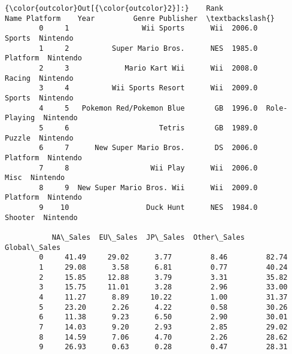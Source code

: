 \documentclass[11pt]{article}
\begin{document}
\begin{Verbatim}[commandchars=\\\{\}]
{\color{outcolor}Out[{\color{outcolor}2}]:}    Rank                       Name Platform    Year         Genre Publisher  \textbackslash{}
        0     1                 Wii Sports      Wii  2006.0        Sports  Nintendo   
        1     2          Super Mario Bros.      NES  1985.0      Platform  Nintendo   
        2     3             Mario Kart Wii      Wii  2008.0        Racing  Nintendo   
        3     4          Wii Sports Resort      Wii  2009.0        Sports  Nintendo   
        4     5   Pokemon Red/Pokemon Blue       GB  1996.0  Role-Playing  Nintendo   
        5     6                     Tetris       GB  1989.0        Puzzle  Nintendo   
        6     7      New Super Mario Bros.       DS  2006.0      Platform  Nintendo   
        7     8                   Wii Play      Wii  2006.0          Misc  Nintendo   
        8     9  New Super Mario Bros. Wii      Wii  2009.0      Platform  Nintendo   
        9    10                  Duck Hunt      NES  1984.0       Shooter  Nintendo   
        
           NA\_Sales  EU\_Sales  JP\_Sales  Other\_Sales  Global\_Sales  
        0     41.49     29.02      3.77         8.46         82.74  
        1     29.08      3.58      6.81         0.77         40.24  
        2     15.85     12.88      3.79         3.31         35.82  
        3     15.75     11.01      3.28         2.96         33.00  
        4     11.27      8.89     10.22         1.00         31.37  
        5     23.20      2.26      4.22         0.58         30.26  
        6     11.38      9.23      6.50         2.90         30.01  
        7     14.03      9.20      2.93         2.85         29.02  
        8     14.59      7.06      4.70         2.26         28.62  
        9     26.93      0.63      0.28         0.47         28.31  
\end{Verbatim}
            
\end{document}
